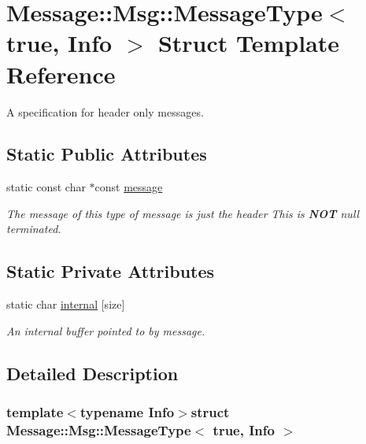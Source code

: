 \hypertarget{struct_message_1_1_msg_1_1_message_type_3_01true_00_01_info_01_4}{\section{Message\-:\-:Msg\-:\-:Message\-Type$<$ true, Info $>$ Struct Template Reference}
\label{struct_message_1_1_msg_1_1_message_type_3_01true_00_01_info_01_4}
}


A specification for header only messages.  


\subsection*{Static Public Attributes}
\begin{DoxyCompactItemize}
\item 
static const char $\ast$const \hyperlink{struct_message_1_1_msg_1_1_message_type_3_01true_00_01_info_01_4_af95de5744fd55ef53ddc12587b4be239}{message}
\begin{DoxyCompactList}\small\item\em The message of this type of message is just the header This is {\bfseries N\-O\-T} null terminated. \end{DoxyCompactList}\end{DoxyCompactItemize}
\subsection*{Static Private Attributes}
\begin{DoxyCompactItemize}
\item 
static char \hyperlink{struct_message_1_1_msg_1_1_message_type_3_01true_00_01_info_01_4_ac84b1b4f1d2d30f0dbf5689ddc471955}{internal} \mbox{[}size\mbox{]}
\begin{DoxyCompactList}\small\item\em An internal buffer pointed to by message. \end{DoxyCompactList}\end{DoxyCompactItemize}


\subsection{Detailed Description}
\subsubsection*{template$<$typename Info$>$struct Message\-::\-Msg\-::\-Message\-Type$<$ true, Info $>$}

